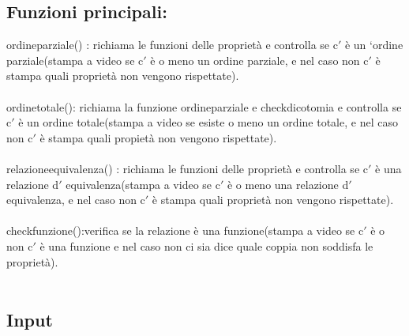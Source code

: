 \documentclass[11pt, a4paper, titlepage, block]{article}
\begin{document}
	\subsection{Funzioni principali:}
	ordine\textunderscore parziale() : richiama le funzioni delle propriet\`a e controlla se c$'$ \`e un ‘ordine parziale(stampa a video se c$'$ \`e o meno un ordine parziale, e nel caso non c$'$ \`e stampa quali propriet\`a non vengono rispettate).\\
	\\
	ordine\textunderscore totale(): richiama la funzione ordine\textunderscore parziale e check\textunderscore dicotomia e controlla se c$'$ \`e un ordine totale(stampa a video se esiste o meno un ordine totale, e nel caso non c$'$ \`e stampa quali propiet\`a non vengono rispettate).\\
	\\
	relazione\textunderscore equivalenza() : richiama le funzioni delle propriet\`a e controlla se c$'$ \`e una relazione d$'$ equivalenza(stampa a video se c$'$ \`e o meno una relazione d$'$ equivalenza, e nel caso non c$'$ \`e stampa quali propriet\`a non vengono rispettate).\\
	\\
	check\textunderscore funzione():verifica se la relazione \`e una funzione(stampa  a video se c$'$ \`e o non c$'$ \`e una funzione e nel caso non ci sia dice quale coppia non soddisfa le propriet\`a).\\
	\\
	\newpage  
	\subsection{Input}
	
\end{document}
